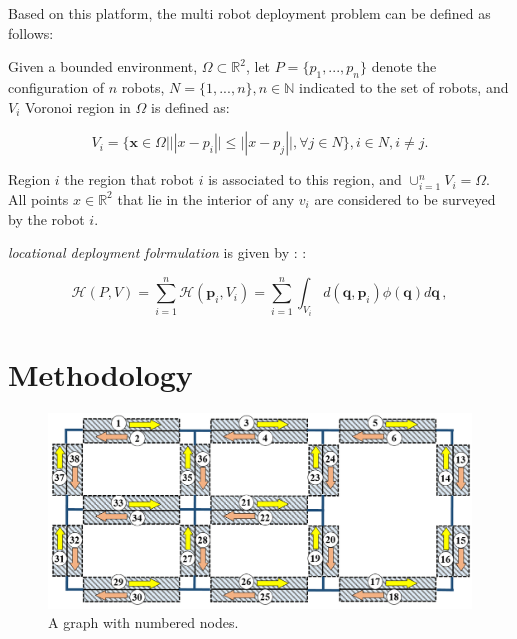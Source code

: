 \documentclass[letterpaper, 10 pt, conference]{ieeeconf}  %
\begin{document}
Based on this platform, the multi robot deployment problem can be defined as follows:

Given a bounded environment, $\Omega \subset \mathbb{R}^2$, let $P=\{p_1, . . . , p_n \}$ denote the configuration of $n$ robots, $N=\{1, . . . , n\}, n \in \mathbb{N}$ indicated to the set of robots, and $V_i$ Voronoi region in $\Omega$ is defined as:

\begin{equation}
\label{eq:VoronoiregionCVT} V_i = \{\mathbf{x} \in \Omega |
||x-p_i|| \leq ||x-p_j||, \forall j
\in N\}, i \in N, i\neq j.
\end{equation}

Region $i$ the region that robot $i$ is associated to this region, and $\cup_{i=1}^n V_i=\Omega$. 
All points $x\in \mathbb R^2$ that lie in the interior of any $v_i$ are considered to be surveyed by the robot $i$.

\textit{locational deployment folrmulation} is given by  \cite{Cortes2004}:
:

\begin{equation}\label{eq:functional1}
\mathcal{H}(P, V) = \sum_{i=1}^{n}\mathcal{H}(\mathbf{p}_i,V_i)=
\sum_{i = 1}^{n} \int_{V_i}
d(\mathbf{q},\mathbf{p}_i)\phi(\mathbf{q})d\mathbf{q} \,,
\end{equation}



\section{Methodology}



\begin{figure}[H]
\centering
\includegraphics[width=1\columnwidth]{Figures/SampleGraphNumbered2.png}
\caption{A graph with numbered nodes.}
\label{fig:numbedGraph}
\end{figure}
\end{document}
